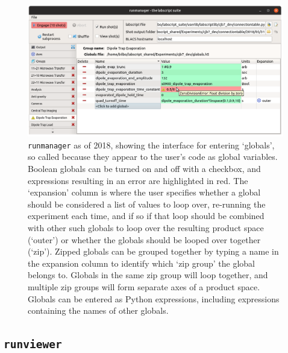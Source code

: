 \begin{figure}[t]
\begin{center}
\includegraphics[width=\textwidth]{figures/software/new_screenshots/runmanager.png}
\caption{\texttt{runmanager} as of 2018, showing the interface for entering `globals', so called because they appear to the user's code as global variables. Boolean globals can be turned on and off with a checkbox, and expressions resulting in an error are highlighted in red. The `expansion' column is where the user specifies whether a global should be considered a list of values to loop over, re-running the experiment each time, and if so if that loop should be combined with other such globals to loop over the resulting product space (`outer') or whether the globals should be looped over together (`zip'). Zipped globals can be grouped together by typing a name in the expansion column to identify which `zip group' the global belongs to. Globals in the same zip group will loop together, and multiple zip groups will form separate axes of a product space. Globals can be entered as Python expressions, including expressions containing the names of other globals.}\label{fig:runmanager}
\end{center}
\end{figure}

\subsection{\texttt{runviewer}}


